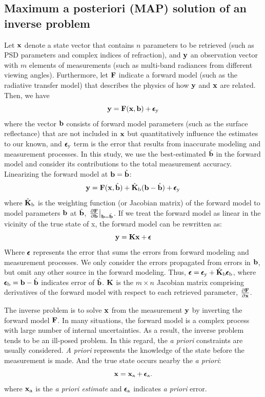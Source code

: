 \subsection{Maximum a posteriori (MAP) solution of an inverse problem}
\label{subsec:map}

Let $\mathbf{x}$ denote a state vector that contains $n$ parameters to be retrieved
(such as PSD parameters and complex indices of refraction), and $\mathbf{y}$ an
observation vector with $m$ elements of measurements (such as multi-band
radiances from different viewing angles). Furthermore, let $\mathbf{F}$ indicate a
forward model (such as the radiative transfer model) that describes the
physics of how $\mathbf{y}$ and $\mathbf{x}$ are related. Then, we have
\begin{equation}
\mathbf{y} = \mathbf{F}(\mathbf{x},\mathbf{b}) + \pmb{\epsilon}_\text{y}
\end{equation}
where the vector $\mathbf{b}$ consists of forward model parameters (such as the
surface reflectance) that are not included in $\mathbf{x}$ but quantitatively
influence the estimates to our known, and $\pmb{\epsilon}_\text{y}$ term is the error that
results from inaccurate modeling and measurement processes. In this
study, we use the best-estimated $\hat{\mathbf{b}}$ in the forward model and consider
its contributions to the total measurement accuracy. Linearizing the
forward model at $\mathbf{b}=\hat{\mathbf{b}}$:
\begin{equation}
\mathbf{y} = \mathbf{F}(\mathbf{x},\hat{\mathbf{b}})+\hat{\mathbf{K}}_\text{b}(\mathbf{b}-\hat{\mathbf{b}})+\pmb{\epsilon}_\text{y}
\label{eq:mfx-b}
\end{equation}
where $\hat{\mathbf{K}}_\text{b}$ is the weighting function (or Jacobian matrix) 
of the forward model to model parameters $\mathbf{b}$ at $\hat{\mathbf{b}}$,
$\left.\frac{\partial\mathbf{F}}{\partial\mathbf{b}}\right|_{\mathbf{b}=\hat{\mathbf{b}}}$. 
If we treat the forward model as
linear in the vicinity of the true state of x, the forward model can be
rewritten as:
\begin{equation}
\mathbf{y} = \mathbf{K}\mathbf{x} + \pmb{\epsilon} \label{eq:mfx}
\end{equation}
Where $\pmb{\epsilon}$ represents the error that sums the errors from forward modeling
and measurement processes. We only consider the errors propagated from
errors in $\mathbf{b}$, but omit any other source in the forward modeling. Thus,
$\pmb{\epsilon}=\pmb{\epsilon}_\text{y}+\hat{\mathbf{K}}_\text{b}\pmb{\epsilon}_\text{b}$, where
$\pmb{\epsilon}_\text{b}=\mathbf{b}-\hat{\mathbf{b}}$ indicates error of $\hat{\mathbf{b}}$. $\mathbf{K}$ is the
$m \times n$ Jacobian matrix comprising derivatives of the forward model
with respect to each retrieved parameter,
$\frac{\partial\mathbf{F}}{\partial\mathbf{x}}$. 

The inverse problem is to solve $\mathbf{x}$ from the measurement $\mathbf{y}$ by
inverting the forward model $\mathbf{F}$. In many situations, the forward
model is a complex process with large number of internal uncertainties.
As a result, the inverse problem tends to be an ill-posed problem. In
this regard, the \textit{a priori} constraints are usually considered.
\textit{A priori} represents the knowledge of the state before the
measurement is made. And the true state occurs nearby the \textit{a
priori}:
\begin{equation}
\mathbf{x} = \mathbf{x}_\text{a} + \pmb{\epsilon}_\text{a}. \label{eq:ap}
\end{equation}
where $\mathbf{x}_\text{a}$ is the \textit{a priori estimate} and $\pmb{\epsilon}_\text{a}$
indicates \textit{a priori} error.

